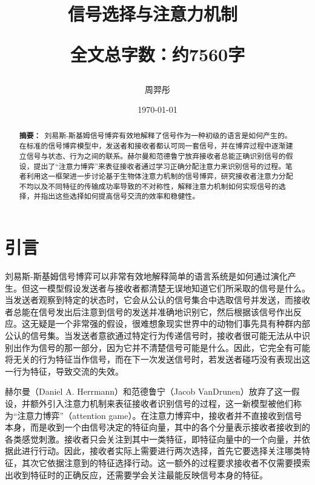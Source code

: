 \documentclass[12pt]{ctexart}  %
\title{\bfseries 信号选择与注意力机制\
\par\vspace{1em}
\large 全文总字数：约7560字}
\author{周羿彤}
\date{\today}
\begin{document}
\maketitle
{}

\begin{abstract}
\noindent
{\bf{摘要：}}\ 刘易斯-斯基姆信号博弈有效地解释了信号作为一种初级的语言是如何产生的。在标准的信号博弈模型中，发送者和接收者都认可同一套信号，并在博弈过程中逐渐建立信号与状态、行为之间的联系。赫尔曼和范德鲁宁放弃接收者总能正确识别信号的假设，提出了“注意力博弈”来表征接收者通过学习正确分配注意力来识别信号的过程。笔者利用这一框架进一步讨论基于生物体注意力机制的信号博弈，研究接收者注意力分配不均以及不同特征的传输成功率导致的不对称性，解释注意力机制如何实现信号的选择，并指出这些选择如何提高信号交流的效率和稳健性。

\par\vspace{1em}
\end{abstract}

\section*{引言}
刘易斯-斯基姆信号博弈可以非常有效地解释简单的语言系统是如何通过演化产生。\cite{Lewis,Skyrms game,Skyrms info}但这一模型假设发送者与接收者都清楚无误地知道它们所采取的信号是什么。当发送者观察到特定的状态时，它会从公认的信号集合中选取信号并发送，而接收者总能在信号发出后注意到信号的发送并准确地识别它，然后根据该信号作出反应。这无疑是一个非常强的假设，很难想象现实世界中的动物们事先具有种群内部公认的信号集。当发送者意欲通过特定行为传递信号时，接收者很可能无法从中识别出作为信号的那一部分，因为它并不清楚信号可能是什么。因此，它完全有可能将无关的行为特征当作信号，而在下一次发送信号时，若发送者碰巧没有表现出这一行为特征，导致交流的失效。

赫尔曼（Daniel A. Herrmann）和范德鲁宁（Jacob VanDrunen）放弃了这一假设，并额外引入注意力机制来表征接收者识别信号的过程，这一新模型被他们称为“注意力博弈”（attention game）。\cite{attention}在注意力博弈中，接收者并不直接收到信号本身，而是收到一个由信号决定的特征向量，其中的各个分量表示接收者接收到的各类感觉刺激。接收者只会关注到其中一类特征，即特征向量中的一个向量，并依据此进行行动。因此，接收者实际上需要进行两次选择，首先它要选择关注哪类特征，其次它依据注意到的特征选择行动。这一额外的过程要求接收者不仅需要摸索出收到特征时的正确反应，还需要学会关注最能反映信号本身的特征。
\end{document}
